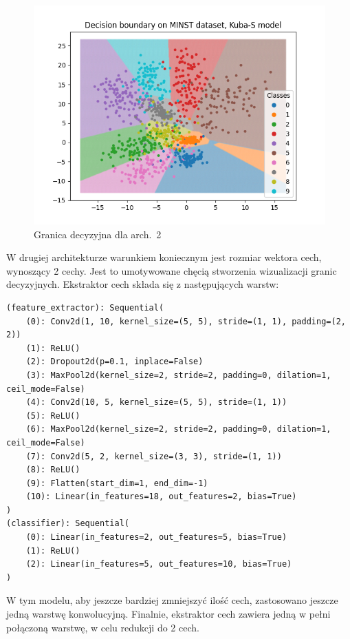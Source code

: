 \documentclass[10pt]{article}
\begin{document}
\begin{figure}
    \includegraphics[width=\linewidth]{img/kuba/mnist/smol_db.png}
    \caption{Granica decyzyjna dla arch.~2}\label{fig:kuba/mnist/smol/decision_boundary}
\end{figure}

W drugiej architekturze warunkiem koniecznym jest rozmiar wektora cech, wynoszący 2 cechy.
Jest to umotywowane chęcią stworzenia wizualizacji granic decyzyjnych.
Ekstraktor cech składa się z następujących warstw:
\tiny
\begin{verbatim}
(feature_extractor): Sequential(
    (0): Conv2d(1, 10, kernel_size=(5, 5), stride=(1, 1), padding=(2, 2))
    (1): ReLU()
    (2): Dropout2d(p=0.1, inplace=False)
    (3): MaxPool2d(kernel_size=2, stride=2, padding=0, dilation=1, ceil_mode=False)
    (4): Conv2d(10, 5, kernel_size=(5, 5), stride=(1, 1))
    (5): ReLU()
    (6): MaxPool2d(kernel_size=2, stride=2, padding=0, dilation=1, ceil_mode=False)
    (7): Conv2d(5, 2, kernel_size=(3, 3), stride=(1, 1))
    (8): ReLU()
    (9): Flatten(start_dim=1, end_dim=-1)
    (10): Linear(in_features=18, out_features=2, bias=True)
)
(classifier): Sequential(
    (0): Linear(in_features=2, out_features=5, bias=True)
    (1): ReLU()
    (2): Linear(in_features=5, out_features=10, bias=True)
)
\end{verbatim}
\normalsize

W tym modelu, aby jeszcze bardziej zmniejszyć ilość cech, zastosowano jeszcze jedną warstwę konwolucyjną.
Finalnie, ekstraktor cech zawiera jedną w pełni połączoną warstwę, w celu redukcji do 2 cech.
\end{document}
